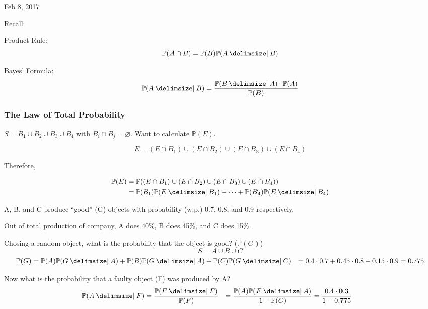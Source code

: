 \documentclass[main.tex]{subfiles}
\begin{document}
\hrulefill{}

Feb 8, 2017

\vspace{3mm}

Recall:

Product Rule: $$\mathbb{P}(A \cap B) = \mathbb{P}(B)\mathbb{P}(A \given B)$$

Bayes' Formula: $$\mathbb{P}(A \given B) = \frac{\mathbb{P}(B \given A)\cdot \mathbb{P}(A)}{\mathbb{P}(B)}$$

\subsubsection{The Law of Total Probability}

$S = B_1 \cup B_2 \cup B_3 \cup B_4$ with $B_i \cap B_j = \varnothing$. Want to calculate $\mathbb{P}(E)$.

$$E = (E\cap B_1) \cup (E \cap B_2) \cup (E \cap B_3) \cup (E \cap B_4)$$

Therefore,

\begin{align}
\mathbb{P}(E) &= \mathbb{P}((E\cap B_1) \cup (E \cap B_2) \cup (E \cap B_3) \cup (E \cap B_4)) \\
              &= \mathbb{P}(B_1)\mathbb{P}(E\given B_1) + \cdots + \mathbb{P}(B_4)\mathbb{P}(E \given B_4)
\end{align}

\begin{exmp}
A, B, and C produce ``good'' (G) objects with probability (w.p.) 0.7, 0.8, and 0.9 respectively.

Out of total production of company, A does 40\%, B does 45\%, and C does 15\%.

Chosing a random object, what is the probability that the object is good? ($\mathbb{P}(G)$)
$$S = A \cup B \cup C$$
\begin{align}
\mathbb{P}(G) &= \mathbb{P}(A)\mathbb{P}(G \given A) + \mathbb{P}(B) \mathbb{P}(G \given A) + \mathbb{P}(C) \mathbb{P}(G \given C)
              &= 0.4 \cdot 0.7 + 0.45 \cdot 0.8 + 0.15 \cdot 0.9 = 0.775
\end{align}

Now what is the probability that a faulty object (F) was produced by A?
\begin{align}
\mathbb{P}(A \given F) &= \frac{\mathbb{P}(F \given F)}{\mathbb{P}(F)}
                       &= \frac{\mathbb{P}(A)\mathbb{P}(F\given A)}{1 - \mathbb{P}(G)}
                       &= \frac{0.4 \cdot 0.3}{1 - 0.775}
\end{align}

\end{exmp}
\end{document}

